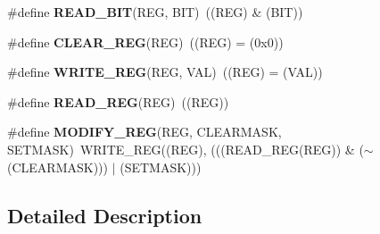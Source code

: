 \begin{DoxyCompactItemize}
\item 
\hypertarget{group___exported__macro_ga822bb1bb9710d5f2fa6396b84e583c33}{\#define {\bfseries R\-E\-A\-D\-\_\-\-B\-I\-T}(R\-E\-G, B\-I\-T)~((R\-E\-G) \& (B\-I\-T))}\label{group___exported__macro_ga822bb1bb9710d5f2fa6396b84e583c33}

\item 
\hypertarget{group___exported__macro_ga1378fbdda39f40b85420df55f41460ef}{\#define {\bfseries C\-L\-E\-A\-R\-\_\-\-R\-E\-G}(R\-E\-G)~((R\-E\-G) = (0x0))}\label{group___exported__macro_ga1378fbdda39f40b85420df55f41460ef}

\item 
\hypertarget{group___exported__macro_ga32f78bffcaf6d13023dcd7f05e0c4d57}{\#define {\bfseries W\-R\-I\-T\-E\-\_\-\-R\-E\-G}(R\-E\-G, V\-A\-L)~((R\-E\-G) = (V\-A\-L))}\label{group___exported__macro_ga32f78bffcaf6d13023dcd7f05e0c4d57}

\item 
\hypertarget{group___exported__macro_gae7f188a4d26c9e713a48414783421071}{\#define {\bfseries R\-E\-A\-D\-\_\-\-R\-E\-G}(R\-E\-G)~((R\-E\-G))}\label{group___exported__macro_gae7f188a4d26c9e713a48414783421071}

\item 
\hypertarget{group___exported__macro_ga6553c99f510c3bab8cc0a91602053247}{\#define {\bfseries M\-O\-D\-I\-F\-Y\-\_\-\-R\-E\-G}(R\-E\-G, C\-L\-E\-A\-R\-M\-A\-S\-K, S\-E\-T\-M\-A\-S\-K)~W\-R\-I\-T\-E\-\_\-\-R\-E\-G((R\-E\-G), (((R\-E\-A\-D\-\_\-\-R\-E\-G(R\-E\-G)) \& ($\sim$(C\-L\-E\-A\-R\-M\-A\-S\-K))) $\vert$ (S\-E\-T\-M\-A\-S\-K)))}\label{group___exported__macro_ga6553c99f510c3bab8cc0a91602053247}

\end{DoxyCompactItemize}


\subsection{Detailed Description}
